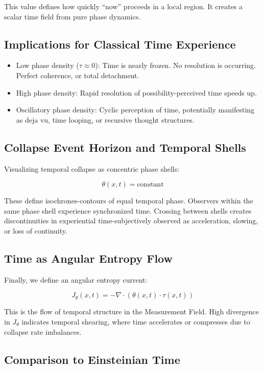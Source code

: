 This value defines how quickly “now” proceeds in a local region. \cite{chapter_time} It creates a scalar time field from pure phase dynamics. \cite{chapter_time} \subsection*{Implications for Classical Time Experience}

\begin{itemize}
  \item Low phase density ($\tau \approx 0$): Time is nearly frozen. \cite{chapter_time} No resolution is occurring. Perfect coherence, or total detachment. \cite{chapter_time} \item High phase density: Rapid resolution of possibility-perceived time speeds up. \cite{chapter_time} \item Oscillatory phase density: Cyclic perception of time, potentially manifesting as deja vu, time looping, or recursive thought structures. \cite{chapter_time} \end{itemize}

\subsection*{Collapse Event Horizon and Temporal Shells}

Visualizing temporal collapse as concentric phase shells:

\[
\theta(x,t) = \text{constant}
\]

These define isochrones-contours of equal temporal phase. \cite{chapter_time} Observers within the same phase shell experience synchronized time. \cite{chapter_time} Crossing between shells creates discontinuities in experiential time-subjectively observed as acceleration, slowing, or loss of continuity. \subsection*{Time as Angular Entropy Flow}

Finally, we define an angular entropy current:

\[
J_\theta(x,t) = -\nabla \cdot \left( \theta(x,t) \cdot \tau(x,t) \right)
\]

This is the flow of temporal structure in the Measurement Field. \cite{chapter_time} High divergence in $J_\theta$ indicates temporal shearing, where time accelerates or compresses due to collapse rate imbalances. \cite{chapter_time} \subsection*{Comparison to Einsteinian Time}

